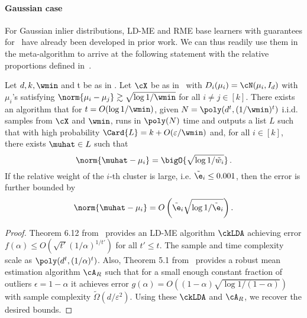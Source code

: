 \paragraph{Gaussian case}

\label{sec:comparison_prev_work}
For Gaussian inlier distributions, LD-ME and RME base learners with guarantees for~ have already been developed in prior work. We can thus readily use them in the meta-algorithm to arrive at the following statement with the relative proportions defined in~.
\begin{corollary}
\label{cor:gaussian}
  Let $d, k, \wmin$ and t be as in .
    Let \(\cX\) be as in~ with \(D_i(\mu_i) = \cN(\mu_i, I_d)\) with \(\mu_i\)'s satisfying 
    \(\norm{\mu_i - \mu_j} \gtrsim \sqrt{\log 1 / \wmin}\) for all $i \neq j \in [k]$. There exists an algorithm that for \(t = O(\log 1 / \wmin)\), given \(N =  \poly(d^t, (1 / \wmin)^t)\) i.i.d. samples from \(\cX\) and \(\wmin\), runs in \(\poly(N)\) time and outputs a list \(L\) such that with high probability \(\Card{L} = k + O(\varepsilon / \wmin)\) and, for all \(i \in [k]\), there exists \(\muhat \in L\) such that
    \[\norm{\muhat - \mu_i} 
    =  \bigO{\sqrt{\log 1 / \tilde w_i}}\,.
    \]
If the relative weight of the $i$-th cluster is large, i.e. \(\tilde \e_i \leq 0.001\), then the error is further bounded by  \[\norm{\muhat - \mu_i} = O\left(\tilde\e_i\sqrt{\log 1 / \tilde \e_i}\right).\] 
\end{corollary}

\begin{proof}
    Theorem 6.12 from~\citep{diakonikolas2023algorithmic} provides an LD-ME algorithm \(\ckLDA\)  achieving error \(f(\alpha) \le O(\sqrt{t'} (1 / \alpha)^{1/t'})\) for all \(t'\le t\). The sample and time complexity scale as \(\poly(d^t, (1/\alpha)^t)\).
    Also, Theorem 5.1 from~\citep{diakonikolas2019robust} provides a robust mean estimation algorithm \(\cA_{R}\) such that for a small enough constant fraction of outliers $\epsilon = 1-\alpha$ it achieves error \(g(\alpha) = O((1 - \alpha) \sqrt{\log 1 / (1 - \alpha)})\) with sample complexity \(\tilde \Omega(d / \varepsilon^2)\). 
    Using these \(\ckLDA\) and \(\cA_R\), we recover the desired bounds. 
\end{proof}


